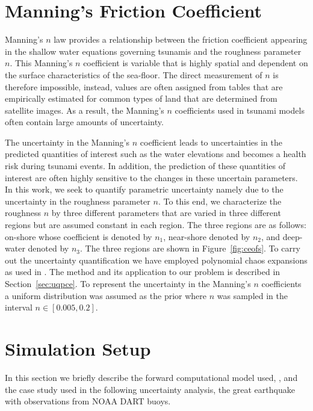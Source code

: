 \section{Manning's Friction Coefficient}

Manning's $n$ law provides a relationship between the friction coefficient appearing in the shallow
water equations governing tsunamis and the roughness parameter $n$. 
This Manning's $n$ coefficient is variable that is highly spatial 
and dependent on the surface characteristics of the sea-floor. 
The direct measurement of $n$ is therefore impossible, instead, values
are often assigned from tables that are empirically estimated
for common types of land that are determined from satellite images.
As a result, the Manning's $n$ coefficients used in tsunami models
often contain large amounts of uncertainty.

The uncertainty in the Manning's $n$ coefficient leads to uncertainties
in the predicted quantities of interest such as the water elevations
and becomes a health risk during tsunami events. In addition, 
the prediction of these quantities of interest are often highly sensitive to 
the changes in these uncertain parameters. 
In this work, we seek to quantify parametric uncertainty namely due 
to the uncertainty in the roughness parameter $n$. To this end,
we characterize the roughness $n$ by three different parameters
that are varied in three different regions but are assumed
constant in each region. The three regions are as follows: 
on-shore whose coefficient is denoted by $n_1$, near-shore 
denoted by $n_2$, and deep-water denoted by $n_3$.
The three regions are shown in Figure~\ref{fig:ceofs}.
To carry out the uncertainty quantification we have employed polynomial chaos expansions 
as used in \cite{sraj:2013a,sraj:2013b}. The method and its application
to our problem is described in Section~\ref{sec:uqpce}.  
To represent the uncertainty in the Manning's $n$ coefficients a uniform 
distribution was assumed as the prior where $n$ was sampled in the interval $n \in [0.005,0.2]$.  

\section{Simulation Setup}

In this section we briefly describe the forward computational model used, \geoclaw, and the case study used in the following uncertainty analysis, the great \tohoku earthquake with observations from NOAA DART buoys.

